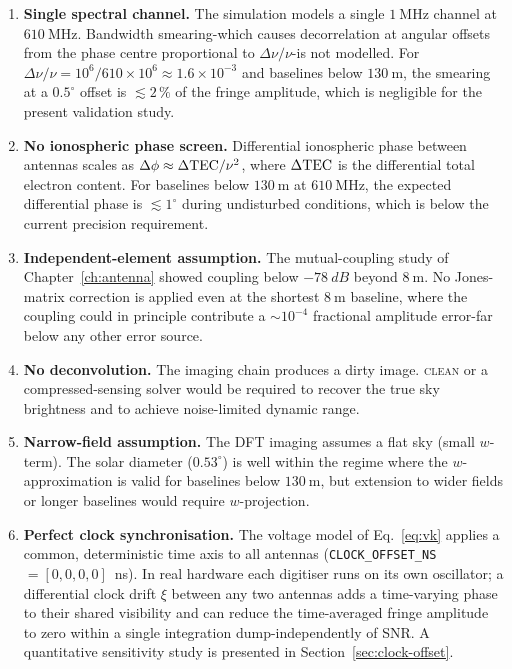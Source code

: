 \begin{enumerate}[leftmargin=1.8em]
  \item \textbf{Single spectral channel.} The simulation models a single
        $\SI{1}{\mega\hertz}$ channel at $\SI{610}{\mega\hertz}$. Bandwidth
        smearing-which causes decorrelation at angular offsets from the phase
        centre proportional to $\Delta\nu/\nu$-is not modelled. For
        $\Delta\nu/\nu = 10^6/610\times10^6 \approx 1.6\times10^{-3}$ and
        baselines below $\SI{130}{\metre}$, the smearing at a $0.5^\circ$ offset
        is $\lesssim2\,\%$ of the fringe amplitude, which is negligible for the
        present validation study.
  \item \textbf{No ionospheric phase screen.} Differential ionospheric
        phase between antennas scales as $\Delta\phi \approx \Delta{\rm TEC}/\nu^2$,
        where $\Delta{\rm TEC}$ is the differential total electron content. For
        baselines below $\SI{130}{\metre}$ at $\SI{610}{\mega\hertz}$, the expected
        differential phase is $\lesssim1^\circ$ during undisturbed conditions, which
        is below the current precision requirement.
  \item \textbf{Independent-element assumption.} The mutual-coupling study of
        Chapter~\ref{ch:antenna} showed coupling below $-78~\si{dB}$ beyond
        $\SI{8}{\metre}$. No Jones-matrix correction is applied even at the shortest
        $\SI{8}{\metre}$ baseline, where the coupling could in principle contribute
        a $\sim10^{-4}$ fractional amplitude error-far below any other error source.
  \item \textbf{No deconvolution.} The imaging chain produces a dirty image.
        \textsc{clean} or a compressed-sensing solver would be required to recover
        the true sky brightness and to achieve noise-limited dynamic range.
  \item \textbf{Narrow-field assumption.} The DFT imaging assumes a flat sky
        (small $w$-term). The solar diameter ($0.53^\circ$) is well within the
        regime where the $w$-approximation is valid for baselines below
        $\SI{130}{\metre}$, but extension to wider fields or longer baselines would
        require $w$-projection.
  \item \textbf{Perfect clock synchronisation.}
        The voltage model of Eq.~\eqref{eq:vk} applies a common, deterministic
        time axis to all antennas (\texttt{CLOCK\_OFFSET\_NS}$=[0,0,0,0]$~ns).
        In real hardware each digitiser runs on its own oscillator; a differential
        clock drift $\xi$ between any two antennas adds a time-varying
        phase to their shared visibility and can reduce the time-averaged fringe
        amplitude to zero within a single integration dump-independently of SNR.
        A quantitative sensitivity study is presented in
        Section~\ref{sec:clock-offset}.
\end{enumerate}

